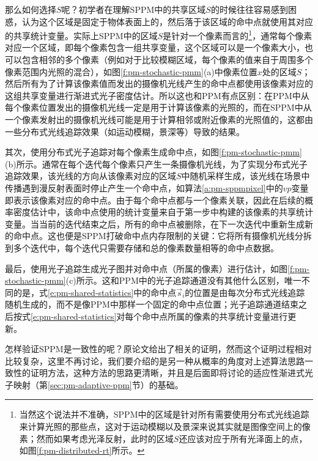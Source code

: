 那么如何选择$S$呢？初学者在理解SPPM中的共享区域$S$的时候往往容易感到困惑，认为这个区域是固定于物体表面上的，然后落于该区域的命中点就使用其对应的共享统计变量。实际上SPPM中的区域$S$是针对一个像素而言的\footnote{当然这个说法并不准确，SPPM中的区域是针对所有需要使用分布式光线追踪来计算光照的那些点，这对于运动模糊以及景深来说其实就是图像空间上的像素；然而如果考虑光泽反射，此时的区域$S$还应该对应于所有光泽面上的点，如图\ref{f:pm-distributed-rt}所示。}，通常每个像素对应一个区域，即每个像素包含一组共享变量，这个区域可以是一个像素大小，也可以包含相邻的多个像素（例如对于比较模糊区域，每个像素的值来自于周围多个像素范围内光照的混合），如图\ref{f:pm-stochastic-pmm}(a)中像素位置$x$处的区域$S$；然后所有为了计算该像素值而发出的摄像机光线产生的命中点都使用该像素对应的这组共享变量进行渐进式光子密度估计。所以这也和PPM有点区别：在PPM中从每个像素位置发出的摄像机光线一定是用于计算该像素的光照的，而在SPPM中从一个像素发射出的摄像机光线可能是用于计算相邻或附近像素的光照值的，这都由一些分布式光线追踪效果（如运动模糊，景深等）导致的结果。

其次，使用分布式光子追踪对每个像素生成命中点，如图\ref{f:pm-stochastic-pmm}(b)所示。通常在每个迭代每个像素只产生一条摄像机光线，为了实现分布式光子追踪效果，该光线的方向从该像素对应的区域$S$中随机采样生成，该光线在场景中传播遇到漫反射表面时停止产生一个命中点，如算法\ref{a:pm-sppmpixel}中的$vp$变量即表示该像素对应的命中点。由于每个命中点都与一个像素关联，因此在后续的概率密度估计中，该命中点使用的统计变量来自于第一步中构建的该像素的共享统计变量。当当前的迭代结束之后，所有的命中点被删除，在下一次迭代中重新生成新的命中点。这也便是SPPM打破命中点内存限制的关键：它将所有摄像机光线分拆到多个迭代中，每个迭代只需要存储和总的像素数量相等的命中点数据。

最后，使用光子追踪生成光子图并对命中点（所属的像素）进行估计，如图\ref{f:pm-stochastic-pmm}(c)所示。这和PPM中的光子追踪通道没有其他什么区别，唯一不同的是，式\ref{e:pm-shared-statistics}中的命中点$\vec{s}_i$的位置是由每次分布式光线追踪随机生成的，而不是像PPM中那样一个固定的命中点位置；光子追踪通道结束之后按式\ref{e:pm-shared-statistics}对每个命中点所属的像素的共享统计变量进行更新。

怎样验证SPPM是一致性的呢？原论文\cite{a:StochasticProgressivePhotonMapping}给出了相关的证明，然而这个证明过程相对比较复杂，这里不再讨论，我们要介绍的是另一种从概率的角度对上述算法思路一致性的证明方法，这种方法的思路更清晰，并且是后面即将讨论的适应性渐进式光子映射（第\ref{sec:pm-adaptive-ppm}节）的基础。





